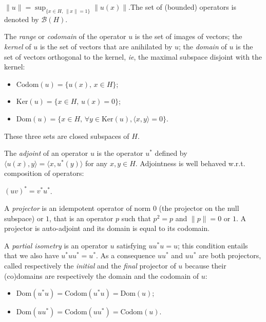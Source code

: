 \begin{description}
\tightlist
\item[]
\(\|u\| = \sup_{\{x\in H,\, \|x\| = 1\}}\|u(x)\|\).The set of (bounded)
operators is denoted by \(\mathcal{B}(H)\).
\end{description}

The \emph{range} or \emph{codomain} of the operator \(u\) is the set of
images of vectors; the \emph{kernel} of \(u\) is the set of vectors that
are anihilated by \(u\); the \emph{domain} of \(u\) is the set of
vectors orthogonal to the kernel, \emph{ie}, the maximal subspace
disjoint with the kernel:

\begin{itemize}
\tightlist
\item
  \(\mathrm{Codom}(u) = \{u(x),\, x\in H\}\);
\item
  \(\mathrm{Ker}(u) = \{x\in H,\, u(x) = 0\}\);
\item
  \(\mathrm{Dom}(u) = \{x\in H,\, \forall y\in\mathrm{Ker}(u), \langle x, y\rangle = 0\}\).
\end{itemize}

These three sets are closed subspaces of \(H\).

The \emph{adjoint} of an operator \(u\) is the operator \(u^*\) defined
by \(\langle u(x), y\rangle = \langle x, u^*(y)\rangle\) for any
\(x,y\in H\). Adjointness is well behaved w.r.t. composition of
operators:

\begin{description}
\tightlist
\item[]
\((uv)^* = v^*u^*\).
\end{description}

A \emph{projector} is an idempotent operator of norm \(0\) (the
projector on the null subspace) or \(1\), that is an operator \(p\) such
that \(p^2 = p\) and \(\|p\| = 0\) or \(1\). A projector is auto-adjoint
and its domain is equal to its codomain.

A \emph{partial isometry} is an operator \(u\) satisfying \(uu^* u =
u\); this condition entails that we also have \(u^*uu^* =
u^*\). As a consequence \(uu^*\) and \(uu^*\) are both projectors,
called respectively the \emph{initial} and the \emph{final} projector of
\(u\) because their (co)domains are respectively the domain and the
codomain of \(u\):

\begin{itemize}
\tightlist
\item
  \(\mathrm{Dom}(u^*u) = \mathrm{Codom}(u^*u) = \mathrm{Dom}(u)\);
\item
  \(\mathrm{Dom}(uu^*) = \mathrm{Codom}(uu^*) = \mathrm{Codom}(u)\).
\end{itemize}

